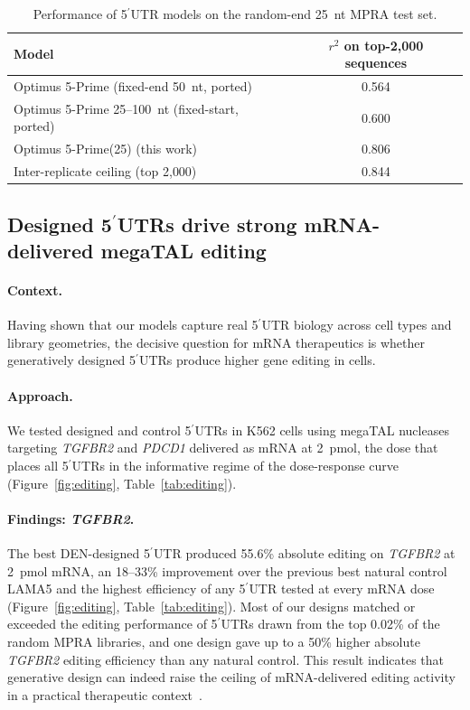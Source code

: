 \documentclass[11pt]{article}
\begin{document}
\begin{table}[htbp]
\centering
\caption{Performance of 5$^\prime$UTR models on the random-end 25~nt
MPRA test set.}
\label{tab:model_perf}
\begin{tabular}{lc}
\toprule
Model & $r^{2}$ on top-2{,}000 sequences \\
\midrule
Optimus 5-Prime (fixed-end 50~nt, ported) & 0.564 \\
Optimus 5-Prime 25--100~nt (fixed-start, ported) & 0.600 \\
Optimus 5-Prime(25) (this work) & 0.806 \\
\midrule
Inter-replicate ceiling (top 2{,}000) & 0.844 \\
\bottomrule
\end{tabular}
\end{table}

\subsection{Designed 5$^\prime$UTRs drive strong mRNA-delivered megaTAL editing}

\paragraph{Context.} Having shown that our models capture real
5$^\prime$UTR biology across cell types and library geometries, the
decisive question for mRNA therapeutics is whether generatively
designed 5$^\prime$UTRs produce higher gene editing in cells.

\paragraph{Approach.} We tested designed and control 5$^\prime$UTRs in
K562 cells using megaTAL nucleases targeting \emph{TGFBR2} and
\emph{PDCD1} delivered as mRNA at 2~pmol, the dose that places all
5$^\prime$UTRs in the informative regime of the dose-response curve
(Figure~\ref{fig:editing}, Table~\ref{tab:editing}).

\paragraph{Findings: \emph{TGFBR2}.} The best DEN-designed
5$^\prime$UTR produced 55.6\% absolute editing on \emph{TGFBR2} at
2~pmol mRNA, an 18--33\% improvement over the previous best natural
control LAMA5 and the highest efficiency of any 5$^\prime$UTR tested
at every mRNA dose (Figure~\ref{fig:editing},
Table~\ref{tab:editing}). Most of our designs matched or exceeded the
editing performance of 5$^\prime$UTRs drawn from the top 0.02\% of the
random MPRA libraries, and one design gave up to a 50\% higher
absolute \emph{TGFBR2} editing efficiency than any natural control.
This result indicates that generative design can indeed raise the
ceiling of mRNA-delivered editing activity in a practical therapeutic
context~\citep{fix2022tgfbr2}.
\end{document}
